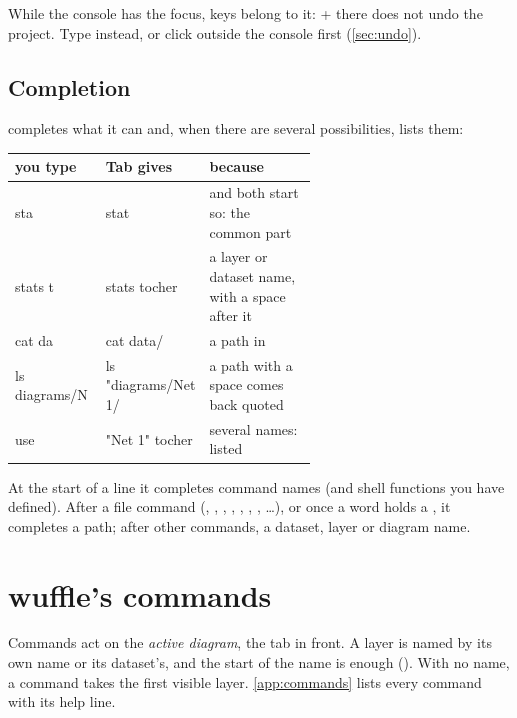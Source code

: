 While the console has the focus, keys belong to it: + there does not undo the
project. Type  instead, or click outside the console first (\cref{sec:undo}).

\subsection{Completion}\label{sec:complete}

 completes what it can and, when there are several possibilities, lists them:

\begin{center}\small
\begin{tabularx}{\linewidth}{@{}>{\ttfamily\raggedright}p{0.3\linewidth}>{\ttfamily\raggedright}p{0.3\linewidth}L@{}}\toprule
\normalfont\sffamily\bfseries you type & \normalfont\sffamily\bfseries Tab gives & \sffamily\bfseries because \\\midrule
sta & stat &  and  both start so: the common part \\
stats t & stats tocher & a layer or dataset name, with a space after it \\
cat da & cat data/ & a path in  \\
ls diagrams/N & ls "diagrams/Net 1/ & a path with a space comes back quoted \\
use \textvisiblespace & "Net 1" \enskip tocher & several names: listed \\
\bottomrule\end{tabularx}
\end{center}

At the start of a line it completes command names (and shell functions you have defined). After a file
command (, , , , , , , …), or
once a word holds a \code{/}, it completes a path; after other commands, a dataset, layer or diagram
name.

\section{wuffle's commands}\label{sec:commands}

Commands act on the \emph{active diagram}, the tab in front. A layer is named by its own name or its
dataset's, and the start of the name is enough (). With no name, a command takes the
first visible layer. \cref{app:commands} lists every command with its help line.

